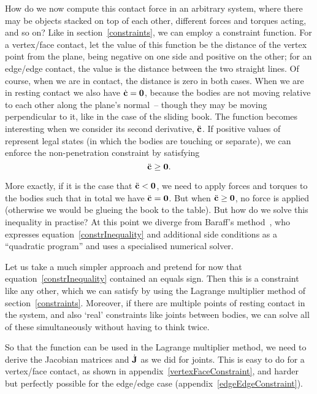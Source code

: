 How do we now compute this contact force in an arbitrary system, where there may be objects stacked
on top of each other, different forces and torques acting, and so on? Like in
section~\ref{constraints}, we can employ a constraint function. For a vertex/face contact, let the
value of this function  be the distance of the vertex point from the plane, being negative on
one side and positive on the other; for an edge/edge contact, the value is the distance between the
two straight lines. Of course, when we are in contact, the distance is zero in both cases. When we
are in resting contact we also have $\dot{\ve{c}} = \ve{0}$, because the bodies are not moving
relative to each other along the plane's normal~-- though they may be moving perpendicular to it,
like in the case of the sliding book. The function becomes interesting when we consider its second
derivative, $\ddot{\ve{c}}$. If positive values of  represent legal states (in which the
bodies are touching or separate), we can enforce the non-penetration constraint by satisfying
\begin{equation} \label{constrInequality}
\ddot{\ve{c}} \ge \ve{0}.
\end{equation}

More exactly, if it is the case that $\ddot{\ve{c}} < \ve{0}$, we need to apply forces and torques
to the bodies such that in total we have $\ddot{\ve{c}} = \ve{0}$. But when
$\ddot{\ve{c}} \ge \ve{0}$, no force is applied (otherwise we would be glueing the book to the
table). But how do we solve this inequality in practise? At this point we diverge from Baraff's
method~\cite{BaraffWitkin:97}, who expresses equation~\ref{constrInequality} and additional
side conditions as a ``quadratic program'' and uses a specialised numerical solver.

Let us take a much simpler approach and pretend for now that equation~\ref{constrInequality}
contained an equals sign. Then this is a constraint like any other, which we can satisfy by using
the Lagrange multiplier method of section~\ref{constraints}. Moreover, if there are multiple
points of resting contact in the system, and also `real' constraints like joints between bodies,
we can solve all of these simultaneously without having to think twice.

So that the function  can be used in the Lagrange multiplier method, we need to derive the
Jacobian matrices  and $\dot{\m{J}}$ as we did for joints. This is easy to do for a
vertex/face contact, as shown in appendix~\ref{vertexFaceConstraint}, and harder but perfectly
possible for the edge/edge case (appendix~\ref{edgeEdgeConstraint}).

